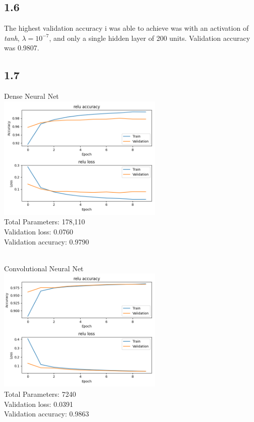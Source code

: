 \documentclass[a4paper,14pt]{extarticle}
\begin{document}
\subsection*{1.6}
The highest validation accuracy i was able to achieve was with an activation of \textit{tanh}, $\lambda = 10^{-7}$, and only a single hidden layer of 200 units. Validation accuracy was 0.9807.
\subsection*{1.7}
\begin{center}
Dense Neural Net\\
\includegraphics[width=300]{Figure_1_200_100_original.png}\\
Total Parameters: 178,110\\
Validation loss: 0.0760\\
Validation accuracy: 0.9790\\\\
\end{center}
\begin{center}
Convolutional Neural Net\\
\includegraphics[width=300]{relu_learn_c.png}\\
Total Parameters: 7240\\
Validation loss: 0.0391\\
Validation accuracy: 0.9863\\
\end{center}
\end{document}
